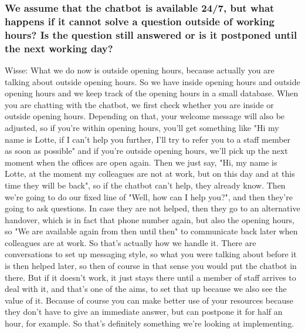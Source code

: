 \begin{appendices}
	\subsubsection{We assume that the chatbot is available 24/7, but what happens if it cannot solve a question outside of working hours? Is the question still answered or is it postponed until the next working day?}
	Wisse: What we do now is outside opening hours, because actually you are talking about outside opening hours. So we have inside opening hours and outside opening hours and we keep track of the opening hours in a small database. When you are chatting with the chatbot, we first check whether you are inside or outside opening hours. Depending on that, your welcome message will also be adjusted, so if you're within opening hours, you'll get something like "Hi my name is Lotte, if I can't help you further, I'll try to refer you to a staff member as soon as possible" and if you're outside opening hours, we'll pick up the next moment when the offices are open again. Then we just say, "Hi, my name is Lotte, at the moment my colleagues are not at work, but on this day and at this time they will be back", so if the chatbot can't help, they already know. Then we're going to do our fixed line of "Well, how can I help you?", and then they're going to ask questions. In case they are not helped, then they go to an alternative handover, which is in fact that phone number again, but also the opening hours, so "We are available again from then until then" to communicate back later when colleagues are at work. So that's actually how we handle it. There are conversations to set up messaging style, so what you were talking about before it is then helped later, so then of course in that sense you would put the chatbot in there. But if it doesn't work, it just stays there until a member of staff arrives to deal with it, and that's one of the aims, to set that up because we also see the value of it. Because of course you can make better use of your resources because they don't have to give an immediate answer, but can postpone it for half an hour, for example. So that's definitely something we're looking at implementing.
	

\end{appendices}
